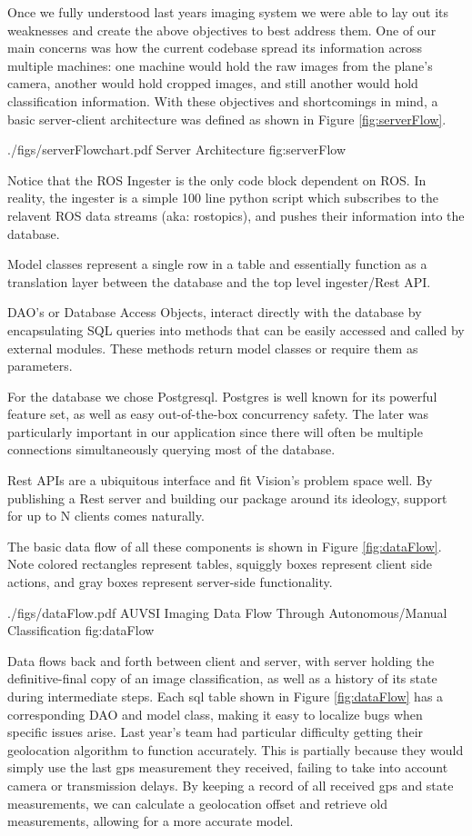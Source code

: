 \documentclass[]{auvsi_doc}
\begin{document}
Once we fully understood last years imaging system we were able to lay out its weaknesses
and create the above objectives to best address them. One of our main concerns was how the 
current codebase spread its information across multiple machines: one machine would hold 
the raw images from the plane's camera, another would hold cropped images, and still another
would hold classification information. With these objectives and shortcomings in mind, a 
basic server-client architecture was defined as shown in Figure \ref{fig:serverFlow}.

\AUVSIFigure
{./figs/serverFlowchart.pdf}
{\textwidth}
{Server Architecture}
{fig:serverFlow}

Notice that the ROS Ingester is the only code block dependent on ROS. In reality, the
ingester is a simple 100 line python script which subscribes to the relavent ROS data
streams (aka: rostopics), and pushes their information into the database.

Model classes represent a single row in a table and essentially function as a translation
layer between the database and the top level ingester/Rest API. 

DAO's or Database Access Objects, interact directly with the database by encapsulating
SQL queries into methods that can be easily accessed and called by external modules.
These methods return model classes or require them as parameters.

For the database we chose Postgresql. Postgres is well known for its powerful
feature set, as well as easy out-of-the-box concurrency safety. The later was particularly
important in our application since there will often be multiple connections simultaneously 
querying most of the database.

Rest APIs are a ubiquitous interface and fit Vision's problem space well. By publishing a
Rest server and building our package around its ideology, support for up to N clients comes
naturally. 

The basic data flow of all these components is shown in Figure \ref{fig:dataFlow}. Note
colored rectangles represent tables, squiggly boxes represent client side actions,
and gray boxes represent server-side functionality.

\AUVSIFigure
{./figs/dataFlow.pdf}
{\textwidth}
{AUVSI Imaging Data Flow Through Autonomous/Manual Classification}
{fig:dataFlow}

Data flows back and forth between client and server, with server holding the definitive-final
copy of an image classification, as well as a history of its state during intermediate steps.
Each sql table shown in Figure \ref{fig:dataFlow} has a corresponding DAO and model class,
making it easy to localize bugs when specific issues arise. Last year's team had particular
difficulty getting their geolocation algorithm to function accurately. This is partially 
because they would simply use the last gps measurement they received, failing to take 
into account camera or transmission delays. By keeping a record of all received gps and 
state measurements, we can calculate a geolocation offset and retrieve old measurements,
allowing for a more accurate model.
\end{document}
